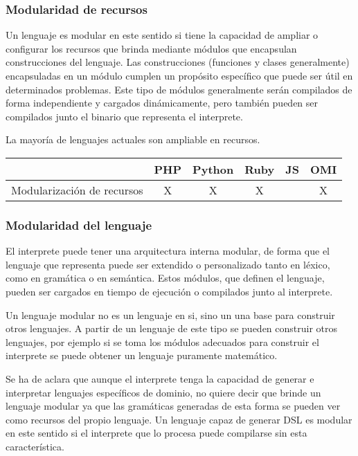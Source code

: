\subsubsection{Modularidad de recursos}
Un lenguaje es modular en este sentido si tiene la capacidad de ampliar o configurar los recursos que brinda mediante módulos 
que encapsulan construcciones del lenguaje. Las construcciones 
(funciones y clases generalmente) encapsuladas en un módulo cumplen un propósito específico
que puede ser útil en determinados problemas. Este tipo de módulos
generalmente serán compilados de forma independiente y cargados dinámicamente, pero 
también pueden ser compilados junto el binario que representa el interprete.

La mayoría de lenguajes actuales son ampliable en recursos. 

\FloatBarrier
\begin{table}[h]
\begin{center}
\begin{tabular}{|r|c|c|c|c|c|} \hline
 & PHP  & Python & Ruby & JS & OMI\\ \hline
Modularización de recursos & X & X & X &   & X \\ \hline
\end{tabular}
\end{center}
\end{table}
\FloatBarrier

\subsubsection{Modularidad del lenguaje}
El interprete puede tener una arquitectura interna modular, de forma que el 
lenguaje que representa puede ser extendido o personalizado tanto 
en léxico, como en gramática o en semántica.  Estos módulos, que definen
el lenguaje, pueden ser cargados en tiempo de ejecución o compilados junto 
al interprete.

Un lenguaje modular no es un lenguaje en si, sino un una base para construir otros 
lenguajes. A partir de un lenguaje de este tipo se pueden construir otros lenguajes,
por ejemplo si se toma los módulos adecuados para construir el interprete
se puede obtener un lenguaje puramente matemático.

Se ha de aclara que aunque el interprete tenga la capacidad de generar e interpretar lenguajes
específicos de dominio, no quiere decir que brinde un lenguaje modular ya que las gramáticas
generadas de esta forma se pueden ver como recursos del propio lenguaje. Un lenguaje capaz de generar 
DSL es modular en este sentido si el interprete que lo procesa puede compilarse sin esta característica.

